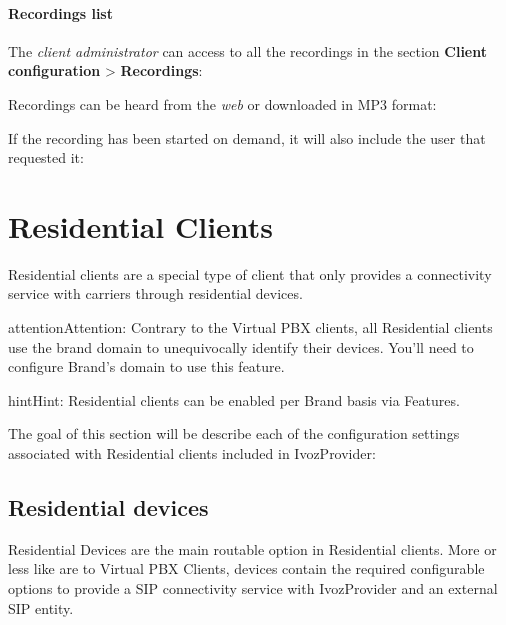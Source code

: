 \documentclass[letterpaper,10pt,english]{sphinxmanual}
\begin{document}
\paragraph{Recordings list}
\label{administration_portal/client/vpbx/calls/call_recordings:recordings-list}
The \emph{client administrator} can access to all the recordings in the section
\textbf{Client configuration} \textgreater{} \textbf{Recordings}:

Recordings can be heard from the \emph{web} or downloaded in MP3 format:

If the recording has been started on demand, it will also include the user
that requested it:


\section{Residential Clients}
\label{administration_portal/client/residential/index:residential-clients}\label{administration_portal/client/residential/index::doc}
Residential clients are a special type of client that only provides a connectivity
service with carriers through residential devices.

\begin{notice}{attention}{Attention:}
Contrary to the Virtual PBX clients, all Residential clients use the
brand domain to unequivocally identify their devices. You'll need to configure
Brand's domain to use this feature.
\end{notice}

\begin{notice}{hint}{Hint:}
Residential clients can be enabled per Brand basis via Features.
\end{notice}

The goal of this section will be describe each of the configuration settings
associated with Residential clients included in IvozProvider:


\subsection{Residential devices}
\label{administration_portal/client/residential/residential_devices:id1}\label{administration_portal/client/residential/residential_devices::doc}\label{administration_portal/client/residential/residential_devices:residential-devices}
Residential Devices are the main routable option in Residential clients.
More or less like {\hyperref[administration_portal/client/vpbx/routing_endpoints/friends/index:friends]{}} are to Virtual PBX Clients, devices
contain the required configurable options to provide a SIP connectivity
service with IvozProvider and an external SIP entity.
\end{document}
